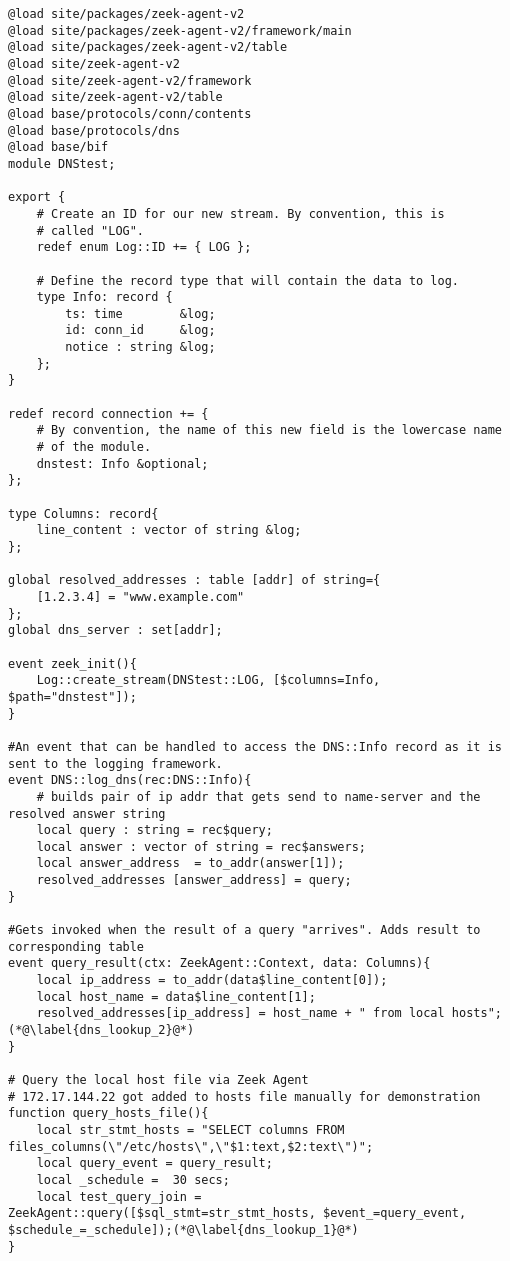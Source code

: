 \begin{lstlisting}[firstnumber=54,linerange={54-59,62-67},caption={Überprüfung der Verbindungsziele eines Endgerätes}]
@load site/packages/zeek-agent-v2
@load site/packages/zeek-agent-v2/framework/main
@load site/packages/zeek-agent-v2/table
@load site/zeek-agent-v2
@load site/zeek-agent-v2/framework
@load site/zeek-agent-v2/table
@load base/protocols/conn/contents
@load base/protocols/dns
@load base/bif
module DNStest;

export {
    # Create an ID for our new stream. By convention, this is
    # called "LOG".
    redef enum Log::ID += { LOG };

    # Define the record type that will contain the data to log.
    type Info: record {
        ts: time        &log;
        id: conn_id     &log; 
        notice : string &log;
    };
}   

redef record connection += {
    # By convention, the name of this new field is the lowercase name
    # of the module.
    dnstest: Info &optional;
};

type Columns: record{
    line_content : vector of string &log;
};

global resolved_addresses : table [addr] of string={
    [1.2.3.4] = "www.example.com"
};
global dns_server : set[addr];

event zeek_init(){
    Log::create_stream(DNStest::LOG, [$columns=Info, $path="dnstest"]);
}

#An event that can be handled to access the DNS::Info record as it is sent to the logging framework.
event DNS::log_dns(rec:DNS::Info){
    # builds pair of ip addr that gets send to name-server and the resolved answer string
    local query : string = rec$query;
    local answer : vector of string = rec$answers;
    local answer_address  = to_addr(answer[1]);
    resolved_addresses [answer_address] = query;
}

#Gets invoked when the result of a query "arrives". Adds result to corresponding table
event query_result(ctx: ZeekAgent::Context, data: Columns){
    local ip_address = to_addr(data$line_content[0]);
    local host_name = data$line_content[1];
    resolved_addresses[ip_address] = host_name + " from local hosts";(*@\label{dns_lookup_2}@*)
}

# Query the local host file via Zeek Agent
# 172.17.144.22 got added to hosts file manually for demonstration
function query_hosts_file(){
    local str_stmt_hosts = "SELECT columns FROM files_columns(\"/etc/hosts\",\"$1:text,$2:text\")";
    local query_event = query_result;
    local _schedule =  30 secs;
    local test_query_join = ZeekAgent::query([$sql_stmt=str_stmt_hosts, $event_=query_event, $schedule_=_schedule]);(*@\label{dns_lookup_1}@*)   
}


\end{lstlisting}
